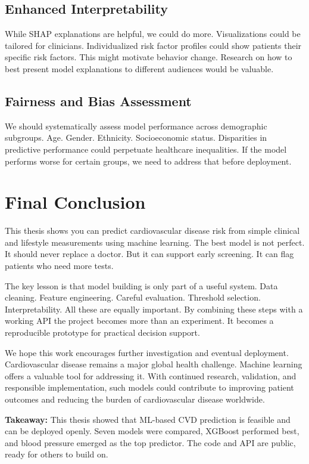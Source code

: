 \documentclass[12pt, a4paper, oneside]{book}
\begin{document}
\subsection{Enhanced Interpretability}
While SHAP explanations are helpful, we could do more. Visualizations could be tailored for clinicians. Individualized risk factor profiles could show patients their specific risk factors. This might motivate behavior change. Research on how to best present model explanations to different audiences would be valuable.

\subsection{Fairness and Bias Assessment}
We should systematically assess model performance across demographic subgroups. Age. Gender. Ethnicity. Socioeconomic status. Disparities in predictive performance could perpetuate healthcare inequalities. If the model performs worse for certain groups, we need to address that before deployment.

\section{Final Conclusion}
This thesis shows you can predict cardiovascular disease risk from simple clinical and lifestyle measurements using machine learning. The best model is not perfect. It should never replace a doctor. But it can support early screening. It can flag patients who need more tests.

The key lesson is that model building is only part of a useful system. Data cleaning. Feature engineering. Careful evaluation. Threshold selection. Interpretability. All these are equally important. By combining these steps with a working API the project becomes more than an experiment. It becomes a reproducible prototype for practical decision support.

We hope this work encourages further investigation and eventual deployment. Cardiovascular disease remains a major global health challenge. Machine learning offers a valuable tool for addressing it. With continued research, validation, and responsible implementation, such models could contribute to improving patient outcomes and reducing the burden of cardiovascular disease worldwide.

\begin{takeaway}
\textbf{Takeaway:} This thesis showed that ML-based CVD prediction is feasible and can be deployed openly. Seven models were compared, XGBoost performed best, and blood pressure emerged as the top predictor. The code and API are public, ready for others to build on.
\end{takeaway}
\end{document}

